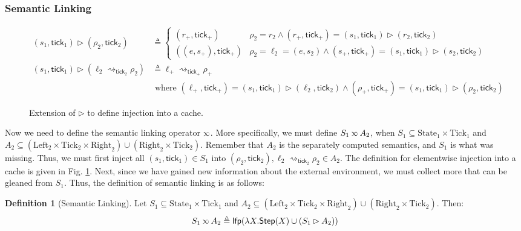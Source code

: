 \documentclass{article}
\theoremstyle{definition}
\newtheorem{definition}{Definition}[section]
\newcommand*{\Left}{\text{Left}}
\newcommand*{\Right}{\text{Right}}
\newcommand*{\State}{\text{State}}
\newcommand*{\Tick}{\text{Tick}}
\newcommand*{\semarrow}{\rightsquigarrow}
\newcommand*{\semlink}{\mathbin{\rotatebox[origin=c]{180}{$\propto$}}}
\newcommand*{\tick}{\mathsf{tick}}
\begin{document}
\subsubsection{Semantic Linking}
\begin{figure}[h!]
  \begin{align*}
    (s_1,\tick_1)\rhd(\rho_2,\tick_2)                  & \triangleq
    \begin{cases}
      (r_+,\tick_+)     & \rho_2=r_2\wedge(r_+,\tick_+)=(s_1,\tick_1)\rhd(r_2,\tick_2)            \\
      ((e,s_+),\tick_+) & \rho_2=\ell_2=(e,s_2)\wedge(s_+,\tick_+)=(s_1,\tick_1)\rhd(s_2,\tick_2)
    \end{cases} \\
    (s_1,\tick_1)\rhd(\ell_2\semarrow_{\tick_2}\rho_2) & \triangleq
    \ell_+\semarrow_{\tick_+}\rho_+                                                             \\
                                                       & \text{ where }
    (\ell_+,\tick_+)=(s_1,\tick_1)\rhd(\ell_2,\tick_2)\wedge
    (\rho_+,\tick_+)=(s_1,\tick_1)\rhd(\rho_2,\tick_2)
  \end{align*}
  \caption{Extension of $\rhd$ to define injection into a cache.}
  \label{fig:extinject}
\end{figure}
Now we need to define the semantic linking operator $\semlink$.
More specifically, we must define $S_1\semlink A_2$, when $S_1\subseteq\State_1\times\Tick_1$ and $A_2\subseteq(\Left_2\times\Tick_2\times\Right_2)\cup(\Right_2\times\Tick_2)$.
Remember that $A_2$ is the separately computed semantics, and $S_1$ is what was missing.
Thus, we must first inject all $(s_1,\tick_1)\in S_1$ into $(\rho_2,\tick_2),\ell_2\semarrow_{\tick_2}\rho_2\in A_2$.
The definition for elementwise injection into a cache is given in Fig. \ref{fig:extinject}.
Next, since we have gained new information about the external environment, we must collect more that can be gleaned from $S_1$.
Thus, the definition of semantic linking is as follows:
\begin{definition}[Semantic Linking]
  Let $S_1\subseteq\State_1\times\Tick_1$ and $A_2\subseteq(\Left_2\times\Tick_2\times\Right_2)\cup(\Right_2\times\Tick_2)$.
  Then:
  \[
    S_1\semlink A_2\triangleq
    \mathsf{lfp}(\lambda X.\mathsf{Step}(X)\cup(S_1\rhd A_2))
  \]
\end{definition}
\end{document}
